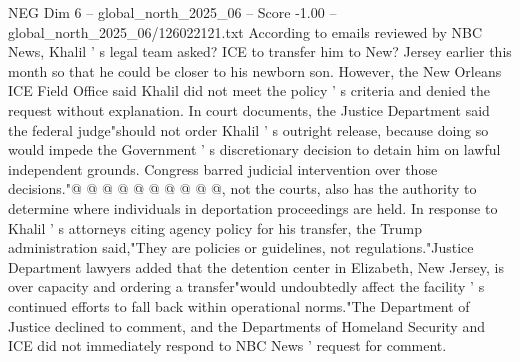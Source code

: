 \begin{textsample}{NEG Dim 6 – global\_north\_2025\_06 – Score -1.00 – global\_north\_2025\_06/126022121.txt}
According to emails reviewed by NBC News, Khalil ' s legal team asked?
ICE to transfer him to New?
Jersey earlier this month so that he could be closer to his newborn son.
However, the New Orleans ICE Field Office said Khalil did not meet the policy ' s criteria and denied the request without explanation.
In court documents, the Justice Department said the federal judge"should not order Khalil ' s outright release, because doing so would impede the Government ' s discretionary decision to detain him on lawful independent grounds.
Congress barred judicial intervention over those decisions."@ @ @ @ @ @ @ @ @ @, not the courts, also has the authority to determine where individuals in deportation proceedings are held.
In response to Khalil ' s attorneys citing agency policy for his transfer, the Trump administration said,"They are policies or guidelines, not regulations."Justice Department lawyers added that the detention center in Elizabeth, New Jersey, is over capacity and ordering a transfer"would undoubtedly affect the facility ' s continued efforts to fall back within operational norms."The Department of Justice declined to comment, and the Departments of Homeland Security and ICE did not immediately respond to NBC News ' request for comment.

\end{textsample}

